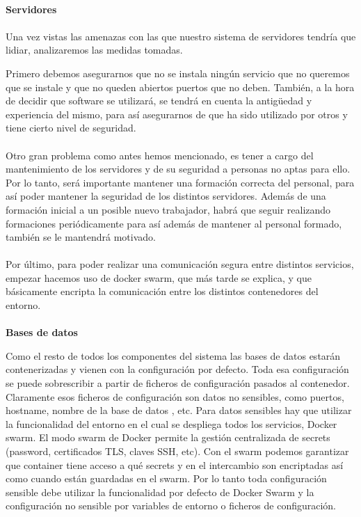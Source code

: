 \paragraph{}
\textbf{Servidores}
\paragraph{}
Una vez vistas las amenazas con las que nuestro sistema de servidores tendría que lidiar, analizaremos las medidas tomadas. 

Primero debemos asegurarnos que no se instala ningún servicio que no queremos que se instale y que no queden abiertos puertos que no deben. También, a la hora de decidir que software se utilizará, se tendrá en cuenta la antigüedad y experiencia del mismo, para así asegurarnos de que ha sido utilizado por otros y tiene cierto nivel de seguridad.
\paragraph{}
Otro gran problema como antes hemos mencionado, es tener a cargo del mantenimiento de los servidores y de su seguridad a personas no aptas para ello. Por lo tanto, será importante mantener una formación correcta del personal, para así poder mantener la seguridad de los distintos servidores. Además de una formación inicial a un posible nuevo trabajador, habrá que seguir realizando formaciones periódicamente para así además de mantener al personal formado, también se le mantendrá motivado.
\paragraph{}
Por último, para poder realizar una comunicación segura entre distintos servicios, empezar hacemos uso de docker swarm, que más tarde se explica, y que básicamente encripta la comunicación entre los distintos contenedores del entorno.
\paragraph{}
\textbf{Bases de datos}

Como el resto de todos los componentes del sistema las bases de datos estarán contenerizadas y vienen con la configuración por defecto. Toda esa configuración se puede sobrescribir a partir de ficheros de configuración pasados al contenedor. Claramente esos ficheros de configuración son datos no sensibles, como puertos, hostname, nombre de la base de datos , etc. Para datos sensibles hay que utilizar la funcionalidad del entorno en el cual se despliega todos los servicios, Docker swarm. El modo swarm de Docker permite la gestión centralizada de secrets (password, certificados TLS, claves SSH, etc). Con el swarm podemos garantizar que container tiene acceso a qué secrets y en el intercambio son encriptadas así como cuando están guardadas en el swarm. Por lo tanto toda configuración sensible debe utilizar la funcionalidad por defecto de Docker Swarm y la configuración no sensible por variables de entorno o ficheros de configuración.
